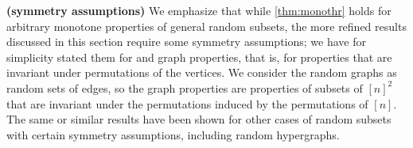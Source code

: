 \documentclass{article}
\newcommand{\bfs}[1]{\textbf{({#1}) }}
\begin{document}
\begin{rema}{\bfs{symmetry assumptions}}
We emphasize that while \cref{thm:monothr} holds for arbitrary monotone properties of general random subsets, the more refined results discussed in this section require some symmetry assumptions; we have for simplicity stated them for  and graph properties, that is, for properties that are invariant under permutations of the vertices. We consider the random graphs as random sets of edges, so the graph properties are properties of subsets of $[n]^{2}$ that are invariant under the permutations induced by the permutations of $[n]$. The same or similar results have been shown for other cases of random subsets with certain symmetry assumptions, including random hypergraphs.
\end{rema}



\end{document}
